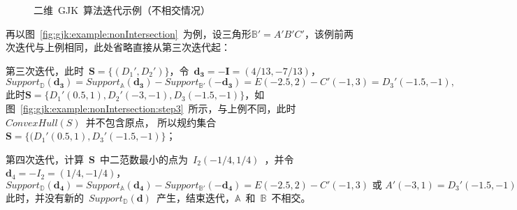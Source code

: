 \begin{figure}[htbp]
\centering
{} 
\caption{二维~GJK~算法迭代示例（不相交情况）}
\label{fig:gjk:example:2d:intersection:iterator}
\end{figure}
再以图~\ref{fig:gjk:example:nonIntersection}~为例，设三角形$\mathbb{B'} = A'B'C'$，该例前两次迭代与上例相同，此处省略直接从第三次迭代起：\\ \indent
\begin{inparaenum}[(1)]
\item 第三次迭代，此时~$\bm{S} = \{(D_1', D_2') \}$，令~$\bm{d_3}=-\bm{I}=(4/13, -7/13)$，
$ Support_\mathbb{D}(\bm{d_3})   = Support_\mathbb{A}(\bm{d_3}) - Support_\mathbb{B'}(-\bm{d_3}) = E(-2.5, 2) - C'(-1, 3)  = D_3'(-1.5, -1),$
此时$\bm{S} = \{D_1'(0.5, 1), D_2'(-3, -1), D_3(-1.5, -1)\}$，如图~\ref{fig:gjk:example:nonIntersection:step3}~所示，与上例不同，此时~$ConvexHull(S)$~并不包含原点，
所以规约集合~$\bm{S} = \{ (D_1'(0.5, 1), D_3'(-1.5, -1)\}$；\\ \indent
\item 第四次迭代，计算~$\bm{S}$~中二范数最小的点为~$I_2(-1/4, 1/4)$~，并令~$\bm{d}_4 = -I_2 = (1/4, -1/4)$，
$Support_\mathbb{D}(\bm{d_4})   = Support_\mathbb{A}(\bm{d_4}) - Support_\mathbb{B'}(-\bm{d_4}) = E(-2.5, 2) - C'(-1, 3) \textrm{~或~} A'(-3, 1)   = D_3'(-1.5, -1) \textrm{~或~} D_1'(0.5, 1),$
此时，并没有新的~$Support_\mathbb{D}(\bm{d})$~产生，结束迭代，$\mathbb{A}$~和~$\mathbb{B}$~不相交。
\end{inparaenum}

